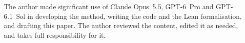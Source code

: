The author made significant use of Claude Opus~5.5, \mbox{GPT-6}~Pro and \mbox{GPT-6.1}~Sol in developing the method, writing the code and the Lean formalisation, and drafting this paper. The author reviewed the content, edited it as needed, and takes full responsibility for it.
